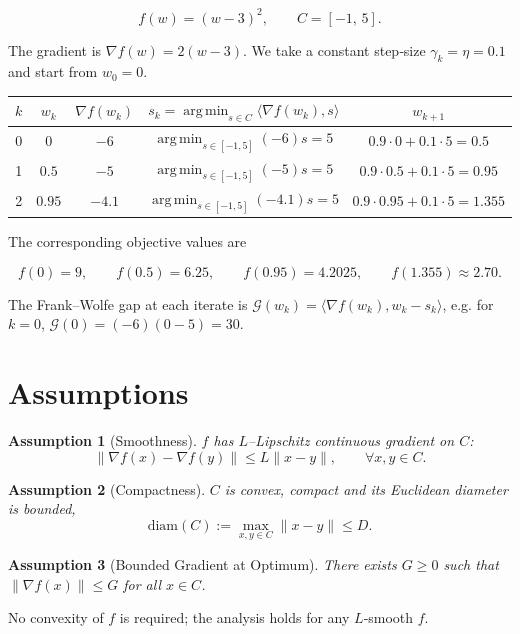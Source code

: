 \documentclass{article}
\newtheorem{assumption}{Assumption}
\newcommand{\diam}{\mathrm{diam}}
\newcommand{\grad}{\nabla}
\newcommand{\inner}[2]{\langle #1,#2\rangle}
\newcommand{\argmin}{\operatorname*{arg\,min}}
\begin{document}
\[
f(w)=(w-3)^{2},\qquad C=[-1,\,5].
\]

The gradient is $\grad f(w)=2(w-3)$.  
We take a constant step‑size $\gamma_{k}= \eta =0.1$ and start from $w_{0}=0$.

\begin{center}
\begin{tabular}{c|c|c|c|c}
$k$ & $w_{k}$ & $\grad f(w_{k})$ & $s_{k}=\argmin_{s\in C}\inner{\grad f(w_{k})}{s}$ & $w_{k+1}$ \\ \hline
0 & $0$ & $-6$ & $\displaystyle\argmin_{s\in[-1,5]}(-6)s = 5$ & $0.9\cdot0+0.1\cdot5=0.5$\\
1 & $0.5$ & $-5$ & $\displaystyle\argmin_{s\in[-1,5]}(-5)s = 5$ & $0.9\cdot0.5+0.1\cdot5=0.95$\\
2 & $0.95$ & $-4.1$ & $\displaystyle\argmin_{s\in[-1,5]}(-4.1)s = 5$ & $0.9\cdot0.95+0.1\cdot5=1.355$\\
\end{tabular}
\end{center}

The corresponding objective values are  

\[
f(0)=9,\qquad f(0.5)=6.25,\qquad f(0.95)=4.2025,\qquad f(1.355)\approx 2.70.
\]

The Frank–Wolfe gap at each iterate is $\mathcal{G}(w_{k})=\inner{\grad f(w_{k})}{w_{k}-s_{k}}$, e.g. for $k=0$,
$\mathcal{G}(0)=(-6)(0-5)=30$.

\section*{Assumptions}
\begin{assumption}[Smoothness]\label{as:smooth}
$f$ has $L$–Lipschitz continuous gradient on $C$:
\[
\|\grad f(x)-\grad f(y)\|\le L\|x-y\|,\qquad\forall x,y\in C .
\]
\end{assumption}

\begin{assumption}[Compactness]\label{as:compact}
$C$ is convex, compact and its Euclidean diameter is bounded,
\[
\diam(C):=\max_{x,y\in C}\|x-y\|\le D .
\]
\end{assumption}

\begin{assumption}[Bounded Gradient at Optimum]\label{as:gradbound}
There exists $G\ge0$ such that $\|\grad f(x)\|\le G$ for all $x\in C$.
\end{assumption}

No convexity of $f$ is required; the analysis holds for any $L$‑smooth $f$.
\end{document}
